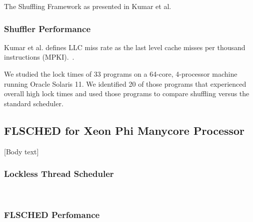 \documentclass{sig-alternate}
\begin{document}
\begin{algorithm}


	\caption{The Shuffling Framework
	as presented in Kumar et al.}\label{euclid}\label{alg:shuffler}
\end{algorithm}

\subsubsection{Shuffler Performance}
\label{sec:shuf_performance}

Kumar et al. defines LLC miss rate as the last level cache misses per thousand instructions (MPKI).~\cite{KumarEtal:2014}.

We studied the lock times of 33 programs on a 64-core, 4-processor machine running Oracle Solaris 11. We identified 20 of those programs that experienced overall high lock times and used those programs to compare shuffling versus the standard scheduler.~\cite{KumarEtal:2014}



\subsection{FLSCHED for Xeon Phi Manycore Processor}
\label{sec:flsched}

[Body text]

\subsubsection{Lockless Thread Scheduler}
\label{sec:flsched_about}

\cite{Lozi:2016, NisarEtal:2017}
~\cite{KumarEtal:2014}

\subsubsection{FLSCHED Perfomance}
\label{sec:flsched_performance}
\end{document}
